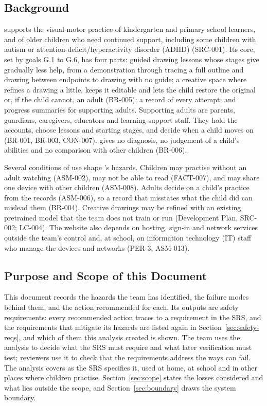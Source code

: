 \documentclass{article}
\begin{document}
\subsection{Background}

\progname{} supports the visual-motor practice of kindergarten and primary
school learners, and of older children who need continued support, including
some children with autism or attention-deficit/hyperactivity disorder (ADHD)
(SRC-001). Its core, set by goals G.1 to G.6, has four parts: guided drawing
lessons whose stages give gradually less help, from a demonstration through
tracing a full outline and drawing between endpoints to drawing with no guide; a
creative space where \progname{} refines a drawing a little, keeps it editable
and lets the child restore the original or, if the child cannot, an adult
(BR-005); a record of every attempt; and progress summaries for supporting
adults. Supporting adults are parents, guardians, caregivers, educators and
learning-support staff. They hold the accounts, choose lessons and starting
stages, and decide when a child moves on (BR-001, BR-003, CON-007). \progname{}
gives no diagnosis, no judgement of a child's abilities and no comparison with
other children (BR-006).

Several conditions of use shape \progname{}'s hazards. Children may practise
without an adult watching (ASM-002), may not be able to read (FACT-007), and may
share one device with other children (ASM-008). Adults decide on a child's
practice from the records (ASM-006), so a record that misstates what the child
did can mislead them (BR-004). Creative drawings may be refined with an existing
pretrained model that the team does not train or run (Development Plan, SRC-002;
LC-004). The website also depends on hosting, sign-in and network services
outside the team's control and, at school, on information technology (IT) staff
who manage the devices and networks (PER-3, ASM-013).

\subsection{Purpose and Scope of this Document}

This document records the hazards the team has identified, the failure modes
behind them, and the action recommended for each. Its outputs are safety
requirements: every recommended action traces to a requirement in the SRS, and
the requirements that mitigate its hazards are listed again in
Section~\ref{sec:safety-reqs}, and which of them this analysis created is shown.
The team uses the analysis to decide what the SRS
must require and what later verification must test; reviewers use it to check
that the requirements address the ways \progname{} can fail. The analysis covers
\progname{} as the SRS specifies it, used at home, at school and in other places
where children practise. Section~\ref{sec:scope} states the losses considered
and what lies outside the scope, and Section~\ref{sec:boundary} draws the system
boundary.
\end{document}

